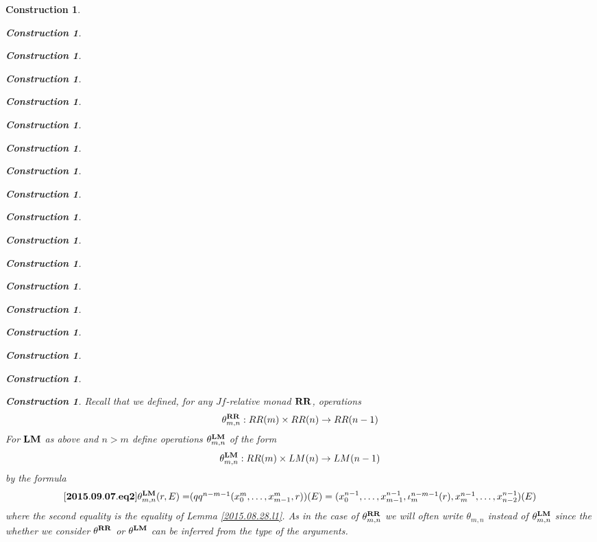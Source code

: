 \documentclass[12pt]{amsart}
\newenvironment{eq}{\begin{equation}}{\end{equation}}
\newtheorem{construction}[proposition]{Construction}
\newcommand{\llabel}[1]{\label{#1}[{\bf #1}]}
\newcommand{\sr}{\rightarrow}
\newcommand{\RR}{{\bf RR}}
\newcommand{\LM}{{\bf LM}}
\begin{document}
\begin{construction}
\begin{construction}
\begin{construction}
\begin{construction}
\begin{construction}
\begin{construction}
\begin{construction}
\begin{construction}
\begin{construction}
\begin{construction}
\begin{construction}
\begin{construction}
\begin{construction}
\begin{construction}
\begin{construction}
\begin{construction}
\begin{construction}
\begin{construction}
Recall that we defined, for any $Jf$-relative monad $\RR$, operations 
%
$$\theta^{\RR}_{m,n}:RR(m)\times RR(n)\sr RR(n-1)$$
% 
For $\LM$ as above and $n>m$ define operations $\theta^{\LM}_{m,n}$ of the form
%
$$\theta^{\LM}_{m,n}:RR(m)\times LM(n)\sr LM(n-1)$$
%
by the formula
%
\begin{eq}\llabel{2015.09.07.eq2}
\theta^{\LM}_{m,n}(r,E)=$$$$(qq^{n-m-1}(x_0^m,\dots,x_{m-1}^m,r))(E)=(x_0^{n-1},\dots,x_{m-1}^{n-1},\iota_m^{n-m-1}(r),x_m^{n-1},\dots, x_{n-2}^{n-1})(E)
\end{eq}
%
where the second equality is the equality of Lemma \ref{2015.08.28.l1}. As in the case of $\theta^{\RR}_{m,n}$ we will often write $\theta_{m,n}$ instead of $\theta^{\LM}_{m,n}$ since the whether we consider $\theta^{\RR}$ or $\theta^{\LM}$ can be inferred from the type of the arguments. 


\end{construction}
\end{construction}
\end{construction}
\end{construction}
\end{construction}
\end{construction}
\end{construction}
\end{construction}
\end{construction}
\end{construction}
\end{construction}
\end{construction}
\end{construction}
\end{construction}
\end{construction}
\end{construction}
\end{construction}
\end{construction}
\end{document}
